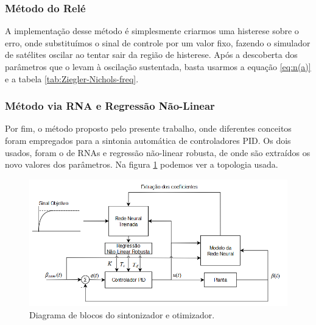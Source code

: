 
\subsubsection{Método do Relé}

A implementação desse método é simplesmente criarmos uma histerese sobre o erro, onde substituímos o sinal de controle por um valor fixo, fazendo o simulador de satélites oscilar ao tentar sair da região de histerese. Após a descoberta dos parâmetros que o levam  à oscilação sustentada, basta usarmos a equação \ref{eq:n(a)} e a tabela \ref{tab:Ziegler-Nichols-freq}.



\subsubsection{Método via RNA e Regressão Não-Linear}

Por fim, o método proposto pelo presente trabalho, onde diferentes conceitos foram empregados para a sintonia automática de controladores PID. Os dois usados, foram o de RNAs e regressão não-linear robusta, de onde são extraídos os novo valores dos parâmetros. Na figura \ref{fig:neural_regression} podemos ver a topologia usada.

\begin{figure}[H]
  \caption{Diagrama de blocos do sintonizador e otimizador.}
  \begin{center}
      \includegraphics[scale=.65]{metodologia/img/neural_regression}
  \end{center}
  \label{fig:neural_regression}
\end{figure}

